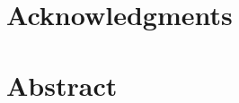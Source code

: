 \documentclass[11pt]{book}
\renewcommand{\baselinestretch}{1.2}
\begin{document}



\newpage
\thispagestyle{empty}
\renewcommand{\thesisdedication}{{\large Copyright \copyright~~Varun Chhangani, 2023\\}{\large All Rights Reserved\\}}
\thesisdedicationpage



\newpage
\thispagestyle{empty}
\renewcommand{\thesisdedication}{\large {\hindifont उद्यमेन हि सिध्यन्ति कार्याणि न मनोरथैः। \\ न हि सुप्तस्य सिंहस्य प्रविशन्ति मुखे मृगाः।।}}
\thesisdedicationpage

\mastersthesis
\renewcommand{\baselinestretch}{1.5}

\chapter*{Acknowledgments}
\label{ch:ack}


\chapter*{Abstract}
\label{ch:abstract}


\tableofcontents
\listoffigures
\listoftables
{}
{}
\end{document}
